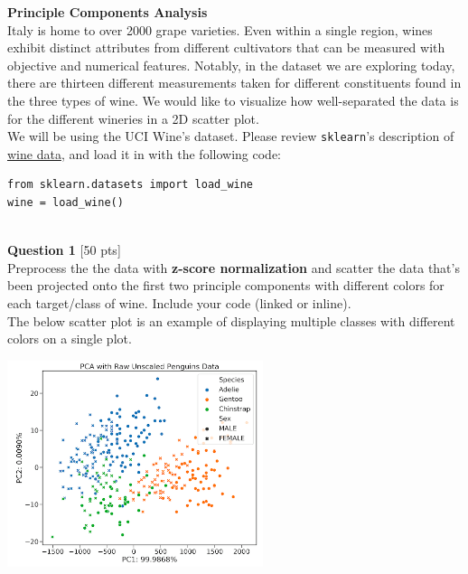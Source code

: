 \documentclass[paper=a4, fontsize=11pt]{scrartcl} %
\author{
    \textbf{YOUR NAME} \\ 
    \textbf{YOUR GIT USERNAME} \\ 
    \textbf{YOUR E-MAIL}
}%
\begin{document}
\maketitle %


{\huge \textbf{Principle Components Analysis}} \\

Italy is home to over 2000 grape varieties. Even within a single region, wines exhibit distinct attributes from different cultivators that can be measured with objective and numerical features. Notably, in the dataset we are exploring today, there are thirteen different measurements taken for different constituents found in the three types of wine. We would like to visualize how well-separated the data is for the different wineries in a 2D scatter plot.\\

We will be using the UCI Wine's dataset. Please review \verb"sklearn"'s description of \href{https://scikit-learn.org/stable/modules/generated/sklearn.datasets.load_wine.html}{wine data}, and load it in with the following code:
\begin{verbatim}
from sklearn.datasets import load_wine
wine = load_wine()
\end{verbatim} \\
\vspace{5mm}
{\Large \textbf{Question 1} [50 pts]} \\

Preprocess the the data with \textbf{z-score normalization} and scatter the data that's been projected onto the first two principle components with different colors for each target/class of wine. Include your code (linked or inline).\\

The below scatter plot is an example of displaying multiple classes with different colors on a single plot.

\begin{center}
    \includegraphics[width=75mm]{images/pca-example.png}
\end{center}
\end{document}
